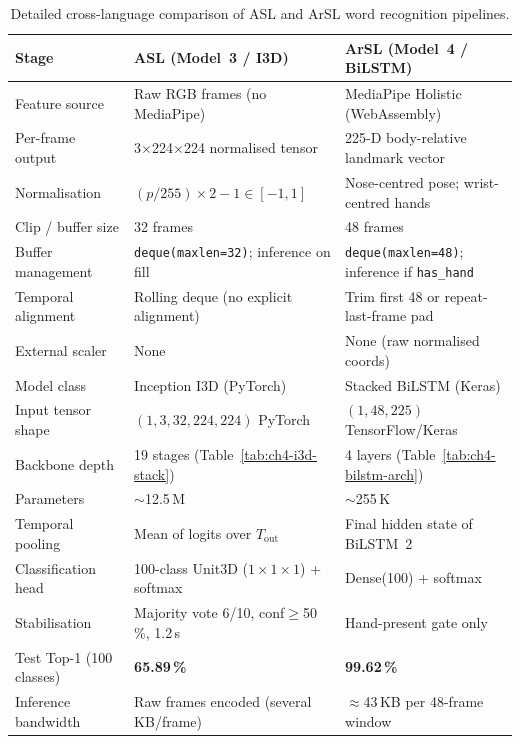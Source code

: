 \begin{table}[H]
\centering
\caption{Detailed cross-language comparison of ASL and ArSL word recognition pipelines.}
\label{tab:ch4-pipeline-compare}
\small
\renewcommand{\arraystretch}{1.2} %
\begin{tabular}{|P{3.5cm}|P{5.5cm}|P{5.5cm}|}
\hline
\textbf{Stage} & \textbf{ASL (Model~3 / I3D)} & \textbf{ArSL (Model~4 / BiLSTM)} \\ \hline
Feature source & Raw RGB frames (no MediaPipe) & MediaPipe Holistic (WebAssembly) \\ \hline
Per-frame output & 3$\times$224$\times$224 normalised tensor & 225-D body-relative landmark vector \\ \hline
Normalisation & $(p/255)\times2 - 1 \in [-1,1]$ & Nose-centred pose; wrist-centred hands \\ \hline
Clip / buffer size & 32 frames & 48 frames \\ \hline
Buffer management & \texttt{deque\allowbreak(maxlen=32)}; inference on fill & \texttt{deque\allowbreak(maxlen=48)}; inference if \texttt{has\_hand} \\ \hline
Temporal alignment & Rolling deque (no explicit alignment) & Trim first 48 or repeat-last-frame pad \\ \hline
External scaler & None & None (raw normalised coords) \\ \hline
Model class & Inception I3D (PyTorch) & Stacked BiLSTM (Keras) \\ \hline
Input tensor shape & $(1,3,32,224,224)$ PyTorch & $(1,48,225)$ TensorFlow/Keras \\ \hline
Backbone depth & 19 stages (Table~\ref{tab:ch4-i3d-stack}) & 4 layers (Table~\ref{tab:ch4-bilstm-arch}) \\ \hline
Parameters & $\sim$12.5\,M & $\sim$255\,K \\ \hline
Temporal pooling & Mean of logits over $T_{\text{out}}$ & Final hidden state of BiLSTM~2 \\ \hline
Classification head & 100-class Unit3D ($1\!\times\!1\!\times\!1$) + softmax & Dense(100) + softmax \\ \hline
Stabilisation & Majority vote 6/10, conf$\geq$50\,\%, 1.2\,s & Hand-present gate only \\ \hline
Test Top-1 (100 classes) & \textbf{65.89\,\%} & \textbf{99.62\,\%} \\ \hline
Inference bandwidth & Raw frames encoded (several KB/frame) & $\approx$43\,KB per 48-frame window \\ \hline
\end{tabular}
\end{table}
\vspace{0.4cm}

